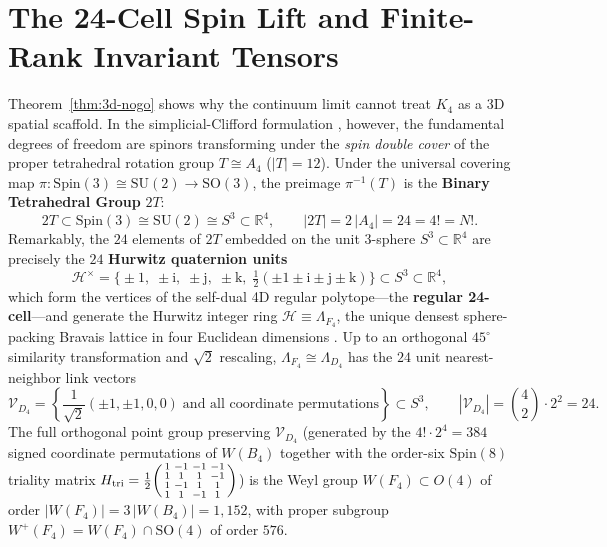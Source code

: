 \documentclass[11pt,a4paper]{article}
\begin{document}
\section{The 24-Cell Spin Lift and Finite-Rank Invariant Tensors}
\label{sec:24cell}

Theorem~\ref{thm:3d-nogo} shows why the continuum limit cannot treat $K_4$ as a 3D spatial scaffold. In the simplicial-Clifford formulation \cite{Olcsak2026JMP}, however, the fundamental degrees of freedom are spinors transforming under the \emph{spin double cover} of the proper tetrahedral rotation group $T \cong A_4$ ($|T| = 12$). Under the universal covering map $\pi\colon \mathrm{Spin}(3) \cong \mathrm{SU}(2) \to \mathrm{SO}(3)$, the preimage $\pi^{-1}(T)$ is the \textbf{Binary Tetrahedral Group} $2T$:
\begin{equation}
2T \subset \mathrm{Spin}(3) \cong \mathrm{SU}(2) \cong S^3 \subset \mathbb{R}^4, \qquad |2T| = 2\,|A_4| = 24 = 4! = N!.
\label{eq:binary-tetrahedral}
\end{equation}
Remarkably, the $24$ elements of $2T$ embedded on the unit 3-sphere $S^3 \subset \mathbb{R}^4$ are precisely the $24$ \textbf{Hurwitz quaternion units}
\begin{equation}
\mathcal{H}^\times = \bigl\{\pm 1,\;\pm\mathrm{i},\;\pm\mathrm{j},\;\pm\mathrm{k},\;\tfrac{1}{2}(\pm 1 \pm \mathrm{i} \pm \mathrm{j} \pm \mathrm{k})\bigr\} \subset S^3 \subset \mathbb{R}^4,
\label{eq:hurwitz-units}
\end{equation}
which form the vertices of the self-dual 4D regular polytope---the \textbf{regular 24-cell}---and generate the Hurwitz integer ring $\mathcal{H} \equiv \Lambda_{F_4}$, the unique densest sphere-packing Bravais lattice in four Euclidean dimensions \cite{Celmaster1982,BhanotBitarHellerNeuberger1990,BhanotBitarHellerNeuberger1991}. Up to an orthogonal $45^\circ$ similarity transformation and $\sqrt{2}$ rescaling, $\Lambda_{F_4} \cong \Lambda_{D_4}$ has the $24$ unit nearest-neighbor link vectors
\begin{equation}
\mathcal{V}_{D_4} = \left\{\frac{1}{\sqrt{2}}(\pm 1, \pm 1, 0, 0) \;\text{and all coordinate permutations}\right\} \subset S^3, \qquad |\mathcal{V}_{D_4}| = \binom{4}{2}\cdot 2^2 = 24.
\label{eq:d4-roots}
\end{equation}
The full orthogonal point group preserving $\mathcal{V}_{D_4}$ (generated by the $4!\cdot 2^4 = 384$ signed coordinate permutations of $W(B_4)$ together with the order-six $\mathrm{Spin}(8)$ triality matrix $H_{\mathrm{tri}} = \frac{1}{2}\begin{psmallmatrix} 1 & -1 & -1 & -1 \\ 1 & 1 & 1 & -1 \\ 1 & -1 & 1 & 1 \\ 1 & 1 & -1 & 1 \end{psmallmatrix}$) is the Weyl group $W(F_4) \subset O(4)$ of order $|W(F_4)| = 3\,|W(B_4)| = 1,152$, with proper subgroup $W^+(F_4) = W(F_4) \cap \mathrm{SO}(4)$ of order $576$.
\end{document}
